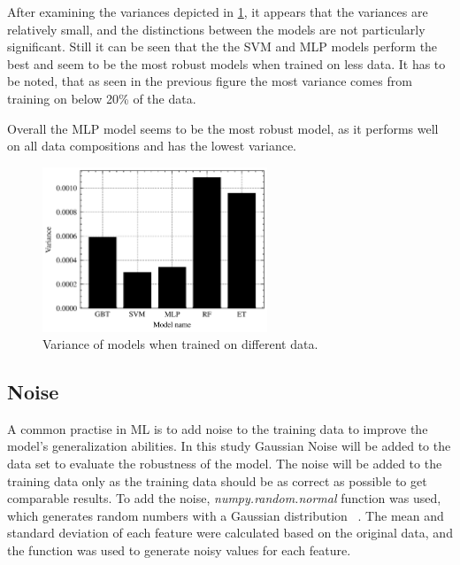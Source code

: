 After examining the variances depicted in \cref{fig:variance-missing-values}, it appears that the variances are
relatively small, and the distinctions between the models are not particularly significant.
Still it can be seen that the the \ac{SVM} and \ac{MLP} models
perform the best and seem to be the most robust models when trained on less data.
It has to be noted, that as seen in the previous figure the most variance comes from training on
below 20\% of the data.

Overall the \ac{MLP} model seems to be the most robust model, as it performs well on all data
compositions and has the lowest variance.

\begin{figure}[h]
    \begin{tcolorbox}[arc=0pt,boxrule=0.5pt]
        \centering
        \includegraphics[width=0.6\textwidth]{chap5/images/variance_missing_values}
    \end{tcolorbox}
    \caption{Variance of models when trained on different data.}
    \label{fig:variance-missing-values}
\end{figure}

\subsection{Noise}\label{subsec:noise}
A common practise in \ac{ML} is to add noise to the training data to improve
the model's generalization abilities.
In this study Gaussian Noise will be added to the data set to evaluate the robustness
of the model.
The noise will be added to the training data only as the training data should be as correct as possible to get
comparable results.
To add the noise, \textit{numpy.random.normal} function was used, which generates random numbers with a Gaussian
distribution
~\cite{harris2020array}.
The mean and standard deviation of each feature were calculated based on the original data, and the function was
used to generate noisy values for each feature.

